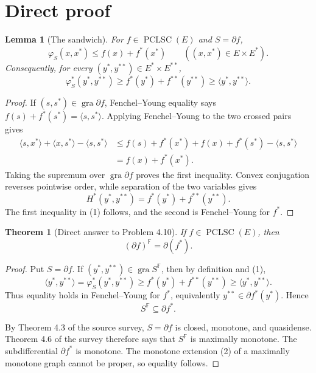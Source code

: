 \documentclass[11pt]{article}
\newtheorem{theorem}{Theorem}
\newtheorem{lemma}{Lemma}
\newcommand{\pair}[2]{\langle #1,#2\rangle}
\newcommand{\gra}{\operatorname{gra}}
\newcommand{\PCLSC}{\operatorname{PCLSC}}
\begin{document}
\section{Direct proof}

\begin{lemma}[The sandwich]
For $f\in\PCLSC(E)$ and $S=\partial f$,
\[
 \varphi_S(x,x^*)\le f(x)+f^*(x^*)
 \qquad ((x,x^*)\in E\times E^*).
\]
Consequently, for every $(y^*,y^{**})\in E^*\times E^{**}$,
\[
 \varphi_S^*(y^*,y^{**})
 \ge f^*(y^*)+f^{**}(y^{**})
 \ge \pair{y^*}{y^{**}}.                       \tag{1}
\]
\end{lemma}

\begin{proof}
If $(s,s^*)\in\gra\partial f$, Fenchel--Young equality says
$f(s)+f^*(s^*)=\pair{s}{s^*}$.  Applying Fenchel--Young to the two crossed
pairs gives
\begin{align*}
 \pair{s}{x^*}+\pair{x}{s^*}-\pair{s}{s^*}
 &\le f(s)+f^*(x^*)+f(x)+f^*(s^*)-\pair{s}{s^*}\\
 &= f(x)+f^*(x^*).
\end{align*}
Taking the supremum over $\gra\partial f$ proves the first inequality.
Convex conjugation reverses pointwise order, while separation of the two
variables gives
\[
 H^*(y^*,y^{**})=f^*(y^*)+f^{**}(y^{**}).
\]
The first inequality in (1) follows, and the second is Fenchel--Young for
$f^*$.
\end{proof}

\begin{theorem}[Direct answer to Problem 4.10]
If $f\in\PCLSC(E)$, then
\[
                    (\partial f)^{\mathbb F}=\partial(f^*).
\]
\end{theorem}

\begin{proof}
Put $S=\partial f$.  If $(y^*,y^{**})\in\gra S^{\mathbb F}$, then by
definition and (1),
\[
 \pair{y^*}{y^{**}}
 =\varphi_S^*(y^*,y^{**})
 \ge f^*(y^*)+f^{**}(y^{**})
 \ge\pair{y^*}{y^{**}}.
\]
Thus equality holds in Fenchel--Young for $f^*$, equivalently
$y^{**}\in\partial f^*(y^*)$.  Hence
\[
                    S^{\mathbb F}\subseteq\partial f^*.       \tag{2}
\]

By Theorem 4.3 of the source survey, $S=\partial f$ is closed, monotone,
and quasidense.  Theorem 4.6 of the survey therefore says that
$S^{\mathbb F}$ is maximally monotone.  The subdifferential $\partial f^*$ is
monotone.  The monotone extension (2) of a maximally monotone graph cannot be
proper, so equality follows.
\end{proof}
\end{document}
